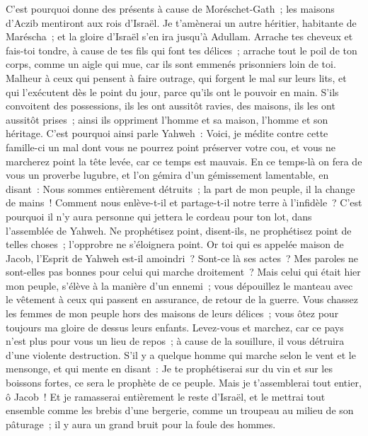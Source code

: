 \begin{multicols}{2}
C'est pourquoi donne des présents à cause de Moréschet-Gath~; les maisons d'Aczib mentiront aux rois d'Israël.
Je t'amènerai un autre héritier, habitante de Maréscha~; et la gloire d'Israël s'en ira jusqu'à Adullam.
Arrache tes cheveux et fais-toi tondre, à cause de tes fils qui font tes délices~; arrache tout le poil de ton corps, comme un aigle qui mue, car ils sont emmenés prisonniers loin de toi.
\VerseOne{}Malheur à ceux qui pensent à faire outrage, qui forgent le mal sur leurs lits, et qui l'exécutent dès le point du jour, parce qu'ils ont le pouvoir en main.
S'ils convoitent des possessions, ils les ont aussitôt ravies, des maisons, ils les ont aussitôt prises~; ainsi ils oppriment l'homme et sa maison, l'homme et son héritage.
C'est pourquoi ainsi parle Yahweh~: Voici, je médite contre cette famille-ci un mal dont vous ne pourrez point préserver votre cou, et vous ne marcherez point la tête levée, car ce temps est mauvais.
En ce temps-là on fera de vous un proverbe lugubre, et l'on gémira d'un gémissement lamentable, en disant~: Nous sommes entièrement détruits~; la part de mon peuple, il la change de mains~! Comment nous enlève-t-il et partage-t-il notre terre à l'infidèle~?
C'est pourquoi il n'y aura personne qui jettera le cordeau pour ton lot, dans l'assemblée de Yahweh.
Ne prophétisez point, disent-ils, ne prophétisez point de telles choses~; l'opprobre ne s'éloignera point.
Or toi qui es appelée maison de Jacob, l'Esprit de Yahweh est-il amoindri~? Sont-ce là ses actes~? Mes paroles ne sont-elles pas bonnes pour celui qui marche droitement~?
Mais celui qui était hier mon peuple, s'élève à la manière d'un ennemi~; vous dépouillez le manteau avec le vêtement à ceux qui passent en assurance, de retour de la guerre.
Vous chassez les femmes de mon peuple hors des maisons de leurs délices~; vous ôtez pour toujours ma gloire de dessus leurs enfants.
Levez-vous et marchez, car ce pays n'est plus pour vous un lieu de repos~; à cause de la souillure, il vous détruira d'une violente destruction.
S'il y a quelque homme qui marche selon le vent et le mensonge, et qui mente en disant~: Je te prophétiserai sur du vin et sur les boissons fortes, ce sera le prophète de ce peuple.
Mais je t'assemblerai tout entier, ô Jacob~! Et je ramasserai entièrement le reste d'Israël, et le mettrai tout ensemble comme les brebis d'une bergerie, comme un troupeau au milieu de son pâturage~; il y aura un grand bruit pour la foule des hommes.

\end{multicols}
